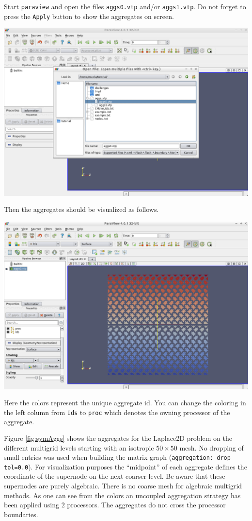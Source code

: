 \documentclass[10pt,fleqn]{book}
\begin{document}
Start \verb|paraview| and open the files \texttt{aggs0.vtp} and/or \texttt{aggs1.vtp}. Do not forget to press the \verb|Apply| button to show the aggregates on screen.
\begin{center}\includegraphics[width=\textwidth]{pics/tut1_17.png} \end{center}
Then the aggregates should be visualized as follows.
\begin{center}\includegraphics[width=\textwidth]{pics/tut1_18.png} \end{center}
Here the colors represent the unique aggregate id. You can change the coloring in the left column from \verb|Ids| to \verb|proc| which denotes the owning processor of the aggregate.

Figure \ref{fig:symAggs} shows the aggregates for the Laplace2D problem on the different multigrid levels starting with an isotropic $50\times 50$ mesh. No dropping of small entries was used when building the matrix graph (\texttt{aggregation: drop tol=0.0}). For visualization purposes the ``midpoint'' of each aggregate defines the coordinate of the supernode on the next coarser level. Be aware that these supernodes are purely algebraic. There is no coarse mesh for algebraic multigrid methods. As one can see from the colors an uncoupled aggregation strategy has been applied using 2 processors. The aggregates do not cross the processor boundaries.
\end{document}
